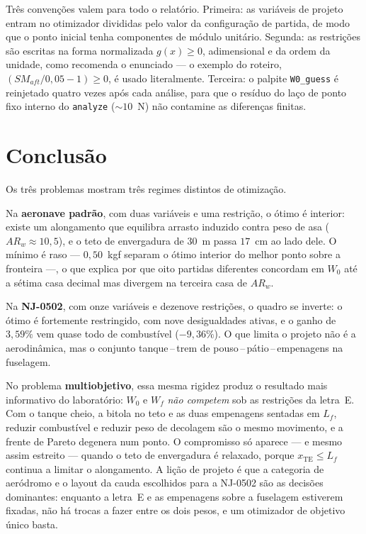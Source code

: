 \documentclass[11pt,a4paper]{article}
\newcommand{\code}[1]{\texttt{\small #1}}
\begin{document}
Três convenções valem para todo o relatório. Primeira: as variáveis de
projeto entram no otimizador divididas pelo valor da configuração de
partida, de modo que o ponto inicial tenha componentes de módulo
unitário. Segunda: as restrições são escritas na forma normalizada
$g(x)\ge 0$, adimensional e da ordem da unidade, como recomenda o
enunciado --- o exemplo do roteiro, $(SM_{aft}/0{,}05-1)\ge 0$, é usado
literalmente. Terceira: o palpite \code{W0\_guess} é reinjetado quatro
vezes após cada análise, para que o resíduo do laço de ponto fixo interno
do \code{analyze} ($\sim 10$~N) não contamine as diferenças finitas.





\section{Conclusão}

Os três problemas mostram três regimes distintos de otimização.

Na \textbf{aeronave padrão}, com duas variáveis e uma restrição, o ótimo
é interior: existe um alongamento que equilibra arrasto induzido contra
peso de asa ($AR_w \approx 10{,}5$), e o teto de envergadura de $30$~m
passa $17$~cm ao lado dele. O mínimo é raso --- $0{,}50$~kgf separam o
ótimo interior do melhor ponto sobre a fronteira ---, o que explica por
que oito partidas diferentes concordam em $W_0$ até a sétima casa
decimal mas divergem na terceira casa de $AR_w$.

Na \textbf{NJ-0502}, com onze variáveis e dezenove restrições, o quadro
se inverte: o ótimo é fortemente restringido, com nove desigualdades
ativas, e o ganho de $3{,}59\%$ vem quase todo de combustível
($-9{,}36\%$). O que limita o projeto não é a aerodinâmica, mas o
conjunto tanque\,--\,trem de pouso\,--\,pátio\,--\,empenagens na fuselagem.

No problema \textbf{multiobjetivo}, essa mesma rigidez produz o resultado
mais informativo do laboratório: $W_0$ e $W_f$ \emph{não competem} sob as
restrições da letra~E. Com o tanque cheio, a bitola no teto e as duas
empenagens sentadas em $L_f$, reduzir combustível e reduzir peso de
decolagem são o mesmo movimento, e a frente de Pareto degenera num ponto.
O compromisso só aparece --- e mesmo assim estreito --- quando o teto de
envergadura é relaxado, porque $x_{\mathrm{TE}}\le L_f$ continua a
limitar o alongamento. A lição de projeto é que a categoria de aeródromo
e o layout da cauda escolhidos para a NJ-0502 são as decisões dominantes:
enquanto a letra~E e as empenagens sobre a fuselagem estiverem fixadas,
não há trocas a fazer entre os dois pesos, e um otimizador de objetivo
único basta.
\end{document}
